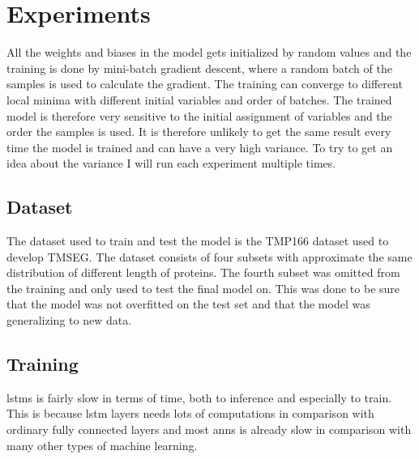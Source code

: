 \section{Experiments}
	

	


All the weights and biases in the model gets initialized by random values and the training
is done by mini-batch gradient descent, where a random batch of the samples is used to 
calculate the gradient. The training can converge to different local minima with 
different initial variables and order of batches.
The trained model is therefore very sensitive to the initial assignment of 
variables and the order the samples is used. It is therefore unlikely to get the same 
result every time the model is trained and can have a very high variance. 
To try to get an idea about the variance I will run each experiment multiple times.


\subsection{Dataset}
The dataset used to train and test the model is the TMP166\cite{tmseg} dataset used to 
develop TMSEG. The dataset consists of four subsets with approximate the same distribution 
of different length of proteins. The fourth subset was omitted from the training and only 
used to test the final model on. This was done to be sure that the model was not overfitted
on the test set and that the model was generalizing to new data. 

\subsection{Training}
\glspl{lstm} is fairly slow in terms of time, both to inference and especially to train.
This is because \gls{lstm} layers needs lots of computations in comparison with ordinary 
fully connected layers and most \glspl{ann} is already slow in comparison with many 
other types of machine learning.

